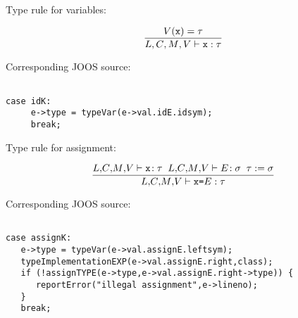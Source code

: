 \begin{slide*}
Type rule for variables:

$$ \frac{\mbox{$V$}{}(\mbox{\tt x}) = \tau}{
         \mbox{$L$}{},\mbox{$C$}{},\mbox{$M$}{},\mbox{$V$}{} \vdash \mbox{\tt x}: \tau} $$

Corresponding JOOS source:
 
\begin{scriptsize}
\begin{verbatim}
 
case idK:
     e->type = typeVar(e->val.idE.idsym);
     break;

\end{verbatim}
\end{scriptsize}
 
Type rule for assignment:

$$ \frac{\lib{},\!\class{},\!\method{},\!\vars{} \vdash \mbox{\tt x}\!:\tau\;\;
         \lib{},\!\class{},\!\method{},\!\vars{} \vdash E\!:\sigma\;\; \tau:=\sigma}{
         \lib{},\!\class{},\!\method{},\!\vars{} \vdash \mbox{\tt x=}E: \tau} $$

Corresponding JOOS source:
 
\begin{scriptsize}
\begin{verbatim}
 
case assignK:
   e->type = typeVar(e->val.assignE.leftsym);
   typeImplementationEXP(e->val.assignE.right,class);
   if (!assignTYPE(e->type,e->val.assignE.right->type)) {
      reportError("illegal assignment",e->lineno);
   }
   break;
 
\end{verbatim}
\end{scriptsize}

\vfil
\end{slide*}


